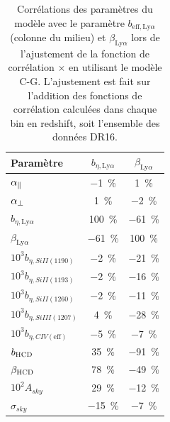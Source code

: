 \documentclass[11pt, twoside, a4paper, openright]{report}
\begin{document}
\begin{table}[]
  \centering
  \caption{Corrélations des paramètres du modèle avec le paramètre $b_{\mathrm{eff},\mathrm{Ly}\alpha}$ (colonne du milieu) et $\beta_{\mathrm{Ly}\alpha}$ lors de l'ajustement de la fonction de corrélation \lya{}$\times$\lya{} en utilisant le modèle C-G. L'ajustement est fait sur l'addition des fonctions de corrélation calculées dans chaque bin en redshift, soit l'ensemble des données DR16.}
  \label{tab:corr_bias_lya}
  \begin{tabular}{lcc}
    \toprule
    Paramètre  & $b_{\eta,\mathrm{Ly}\alpha}$ & $\beta_{\mathrm{Ly}\alpha}$\\
    \midrule
    $\alpha_{\parallel}{} $ & \SI{-1}{\percent} & \SI{1}{\percent}\\
    $\alpha_{\perp}{} $ & \SI{1}{\percent} & \SI{-2}{\percent} \\
    $b_{\eta, \mathrm{Ly}\alpha} $ & \SI{100}{\percent} & \SI{-61}{\percent} \\
    $\beta_{\mathrm{Ly}\alpha} $ & \SI{-61}{\percent} &  \SI{100}{\percent} \\
    $10^3 b_{\eta, SiII(1190)} $ & \SI{-2}{\percent} & \SI{-21}{\percent} \\
    $10^3 b_{\eta, SiII(1193)} $ & \SI{-2}{\percent} & \SI{-16}{\percent} \\
    $10^3 b_{\eta, SiII(1260)} $ & \SI{-2}{\percent} & \SI{-11}{\percent} \\
    $10^3 b_{\eta, SiIII(1207)} $ & \SI{4}{\percent} & \SI{-28}{\percent}\\
    $10^3 b_{\eta, CIV(\mathrm{eff})} $ &\SI{-5}{\percent} & \SI{-7}{\percent}\\
    $b_{\textsc{HCD}} $ & \SI{35}{\percent} & \SI{-91}{\percent}\\
    $\beta_{\textsc{HCD}} $ & \SI{78}{\percent} & \SI{-49}{\percent}\\
    $10^2 A_{sky} $ & \SI{29}{\percent} & \SI{-12}{\percent}\\
    $\sigma_{sky} $ & \SI{-15}{\percent} & \SI{-7}{\percent}\\
    \bottomrule
\end{tabular}
\end{table}
\end{document}
